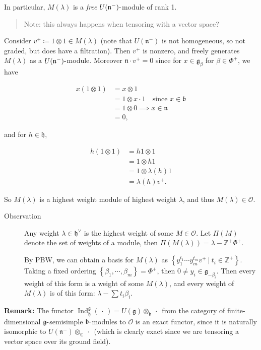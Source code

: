 \documentclass[11pt]{scrartcl}
\theoremstyle{definition}
\theoremstyle{theorem}
\theoremstyle{proof}
\theoremstyle{definition}
\theoremstyle{break}
\theoremstyle{problem}
\def\Ind{\operatorname{Ind}}
\newcommand{\CC}[0]{{\mathbb{C}}}
\newcommand{\ZZ}[0]{{\mathbb{Z}}}
\newcommand{\dash}[0]{{\hbox{-}}}
\newcommand{\definedas}[0]{\coloneqq}
\newcommand{\dual}[0]{^\vee}
\newcommand{\lieb}[0]{{\mathfrak{b}}}
\newcommand{\lieg}[0]{{\mathfrak{g}}}
\newcommand{\lieh}[0]{{\mathfrak{h}}}
\newcommand{\lien}[0]{{\mathfrak{n}}}
\newcommand{\suchthat}[0]{{~\mathrel{\Big|}~}}
\newcommand{\tensor}[0]{\otimes}
\newcommand{\theset}[1]{\left\{{#1}\right\}}
\newcommand{\wait}[0]{{\,\cdot\,}}
\begin{document}
In particular, \(M(\lambda)\) is a \emph{free} \(U(\lien^-)\dash\)module
of rank 1.

\begin{quote}
Note: this always happens when tensoring with a vector space?
\end{quote}

Consider \(v^+ \definedas 1\tensor 1 \in M(\lambda)\) (note that
\(U(\lien^-)\) is not homogeneous, so not graded, but does have a
filtration). Then \(v^+\) is nonzero, and freely generates
\(M(\lambda)\) as a \(U(\lien^-)\dash\)module. Moreover
\(\lien \cdot v^+ = 0\) since for \(x\in \lieg_\beta\) for
\(\beta \in \Phi^+\), we have

\begin{align*}
x(1\tensor 1) &= x\tensor 1  \\
&= 1\tensor x\cdot 1 \quad\text{since } x\in \lieb \\
&= 1 \tensor 0 \implies x\in \lien \\
&= 0
,\end{align*}

and for \(h\in \lieh\),

\begin{align*}
h(1\tensor 1) 
&= h1\tensor 1 \\
&= 1 \tensor h1\\
&=1 \tensor \lambda(h) 1 \\
&=\lambda(h) v^+
.\end{align*}

So \(M(\lambda)\) is a highest weight module of highest weight
\(\lambda\), and thus \(M(\lambda) \in \mathcal O\).

\begin{description}
\item[Observation]
Any weight \(\lambda \in \lieh\dual\) is the highest weight of some
\(M\in \mathcal O\). Let \(\Pi(M)\) denote the set of weights of a
module, then \(\Pi(M(\lambda)) = \lambda - \ZZ^+ \Phi^+\).

By PBW, we can obtain a basis for \(M(\lambda)\) as
\(\theset{ y_1^{t_1} \cdots y_m^{t_m}v^+ \suchthat t_i \in \ZZ^+}\).
Taking a fixed ordering \(\theset{\beta_1, \cdots, \beta_m} = \Phi^+\),
then \(0\neq y_i \in \lieg_{-\beta_i}\). Then every weight of this form
is a weight of some \(M(\lambda)\), and every weight of \(M(\lambda)\)
is of this form: \(\lambda - \sum t_i \beta_i\).
\end{description}

\textbf{Remark:} The functor
\(\Ind_\lieh^\lieg(\wait) = U(\lieg) \tensor_{\lieb} \wait\) from the
category of finite-dimensional \(\lieg\dash\)semisimple
\(\lieb\dash\)modules to \(\mathcal O\) is an exact functor, since it is
naturally isomorphic to \(U(\lien^-) \tensor_\CC \wait\) (which is
clearly exact since we are tensoring a vector space over its ground
field).
\end{document}
